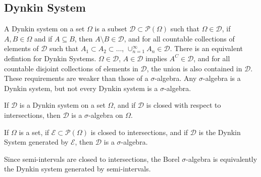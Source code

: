 \documentclass[crop=false,class=book,oneside]{standalone}
\begin{document}
        \subsection{Dynkin System}
            A Dynkin system on a set $\Omega$ is a subset
            $\mathcal{D}\subset\mathcal{P}(\Omega)$ such that
            $\Omega\in\mathcal{D}$, if $A,B\in\Omega$ and if
            $A\subseteq{B}$, then $A\setminus{B}\in\mathcal{D}$,
            and for all countable collections of elements of
            $\mathcal{D}$ such that
            $A_{1}\subset{A}_{2}\subset\hdots$,
            $\cup_{n=1}^{\infty}A_{n}\in\mathcal{D}$. There is
            an equivalent defintion for Dynkin Systems.
            $\Omega\in\mathcal{D}$, $A\in\mathcal{D}$ implies
            $A^{C}\in\mathcal{D}$, and for all countable disjoint
            collections of elements in $\mathcal{D}$, the union
            is also contained in $\mathcal{D}$. These requirements
            are weaker than those of a $\sigma$-algebra. Any
            $\sigma$-algebra is a Dynkin system, but not every
            Dynkin system is a $\sigma$-algebra.
            \begin{theorem}
                If $\mathcal{D}$ is a Dynkin system on a set
                $\Omega$, and if $\mathcal{D}$ is closed with
                respect to intersections, then $\mathcal{D}$
                is a $\sigma$-algebra on $\Omega$.
            \end{theorem}
            \begin{theorem}
                If $\Omega$ is a set, if
                $\mathcal{E}\subset\mathcal{P}(\Omega)$ is closed
                to intersections, and if $\mathcal{D}$ is the
                Dynkin System generated by $\mathcal{E}$, then
                $\mathcal{D}$ is a $\sigma$-algebra.
            \end{theorem}
            Since semi-intervals are closed to intersections,
            the Borel $\sigma$-algebra is equivalently the
            Dynkin system generated by semi-intervals.
\end{document}

